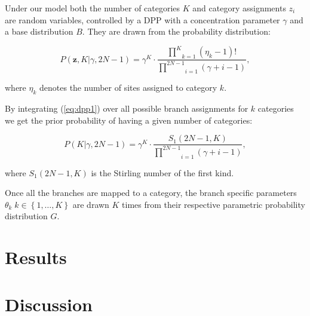 Under our model both the number of categories $K$ and category assignments $z_{i}$ are random variables, controlled by a DPP with a concentration parameter $\gamma$ and a base distribution $B$.
They are drawn from the probability distribution:

\begin{equation}
P(\mathbf{z},K|\gamma,2N-1)=\gamma^{K}\cdot\frac{\underset{k=1}{\overset{K}{\prod}}\left(\eta_{k}-1\right)!}{\underset{i=1}{\overset{2N-1}{\prod}}\left(\gamma+i-1\right)},
\label{eq:dpp1} 
\end{equation} 
 
\noindent 
where $\eta_{k}$ denotes the number of sites assigned to category $k$.

By integrating (\ref{eq:dpp1}) over all possible branch assignments for $k$ categories we get the prior probability of having a given number of categories:

\begin{equation}
P(K|\gamma,2N-1)=\gamma^{K}\cdot\frac{S_{1}(2N-1,K)}{\underset{i=1}{\overset{2N-1}{\prod}}\left(\gamma+i-1\right)},
\label{eq:dpp2} 
\end{equation} 

\noindent
where $S_{1}(2N-1,K)$ is the Stirling number of the first kind. 


Once all the branches are mapped to a category, the branch specific parameters $\theta_{k}\; k\in\left\{ 1,\ldots,K\right\}$ are drawn $K$ times from their respective parametric probability distribution $G$.


\section{Results}




\section{Discussion}



